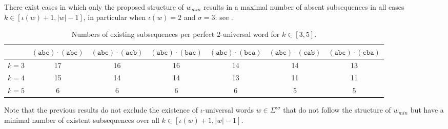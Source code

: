 \documentclass[10pt,a4paper]{amsart}
\theoremstyle{plain}
\theoremstyle{definition}
\begin{document}
There exist cases in which only the proposed structure of $w_{min}$ results in a maximal number of absent subsequences in all cases $k\in[\iota(w)+1,|w|-1]$, in particular when $\iota(w) = 2$ and $\sigma = 3$: see .
\begin{table}[h!]
	\begin{tabular}{c|c|c|c|c|c|c|}
		& $\mathtt{(abc)\cdot (abc)}$ & $\mathtt{(abc) \cdot (acb)}$ & $\mathtt{(abc) \cdot (bac)}$ & $\mathtt{(abc) \cdot (bca)}$ & $\mathtt{(abc) \cdot (cab)}$ & $\mathtt{(abc) \cdot (cba)}$ \\
		\hline
		$k=3$ & 17 & 16 & 16 & 14 & 14 & 13\\
		$k=4$ & 15 & 14 & 14 & 13 & 11 & 11\\
		$k=5$ & 6 & 6 & 6 & 6 & 5 & 5
	\end{tabular}
	\caption{Numbers of existing subsequences per perfect $2$-universal word for $k \in [3,5]$.}\label{tableminimalexisting}
\end{table}

Note that the previous results do not exclude the existence of $\iota$-universal words $w\in\Sigma^{\iota\sigma}$ that do not follow the structure of $w_{min}$ but have a minimal number of existent subsequences over all $k \in [\iota(w)+1,|w|-1]$. 


	
\end{document}
